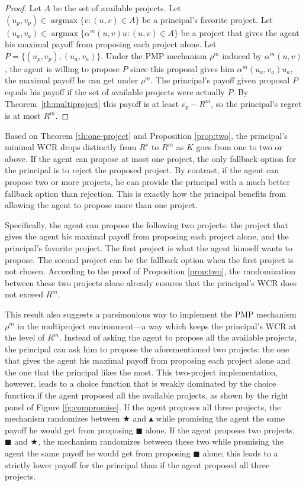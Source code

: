 \documentclass[12pt,english]{article}
\DeclareMathOperator*{\argmax}{argmax}
\theoremstyle{remark}
\theoremstyle{plain}
\theoremstyle{definition}
\newcommand{\wcr}{\mathrm{WCR}}
\begin{document}
\begin{proof}
Let $A$ be the set of available projects. Let $(u_p,v_p)\in \argmax\{v:(u,v)\in A\}$ be a principal's favorite project. Let $(u_a,v_a)\in \argmax\{\alpha^m(u,v)u:(u,v)\in A\}$ be a project that gives the agent his maximal payoff from proposing each project alone. Let $P=\{(u_p,v_p), (u_a,v_a)\}$. Under the PMP mechanism $\rho^m$ induced by $\alpha^m(u,v)$, the agent is willing to propose $P$ since this proposal gives him $\alpha^m(u_a,v_a)u_a$, the maximal payoff he can get under $\rho^m$. The principal's payoff given proposal $P$ equals his payoff if the set of available projects were actually $P$. By Theorem~\ref{th:multiproject} this payoff is at least $v_p - R^m$, so the principal's regret is at most $R^m$.
\end{proof}



Based on Theorem \ref{th:one-project} and Proposition \ref{prop:two}, the principal's minimal $\wcr$ drops distinctly from $R^s$ to $R^m$ as $K$ goes from one to two or above. If the agent can propose at most one project, the only fallback option for the principal is to reject the proposed project. By contrast, if the agent can propose two or more projects, he can provide the principal with a much better fallback option than rejection. This is exactly how the principal benefits from allowing the agent to propose more than one project. 


Specifically, the agent can propose the following two projects: the project that gives the agent his maximal payoff from proposing each project alone, and the principal's favorite project. The first project is what the agent himself wants to propose. The second project can be the fallback option when the first project is not chosen. According to the proof of Proposition \ref{prop:two}, the randomization between these two projects alone already ensures that the principal's $\wcr$ does not exceed $R^m$. 


This result also suggests a parsimonious way to implement the PMP mechanism $\rho^m$ in the multiproject environment---a way which keeps the principal's $\wcr$ at the level of $R^m$. Instead of asking the agent to propose all the available projects, the principal can ask him to propose the aforementioned two projects: the one that gives the agent his maximal payoff from proposing each project alone and the one that the principal likes the most. This two-project implementation, however, leads to a choice function that is weakly dominated by the choice function if the agent proposed all the available projects, as shown by the right panel of Figure \ref{fg:compromise}. If the agent proposes all three projects, the mechanism randomizes between $\bigstar$ and $\blacktriangle$ while promising the agent the same payoff he would get from proposing $\blacksquare$ alone. If the agent proposes two projects, $\blacksquare$ and $\bigstar$, the mechanism randomizes between these two while promising the agent the same payoff he would get from proposing $\blacksquare$ alone; this leads to a strictly lower payoff for the principal than if the agent proposed all three projects. 
\end{document}
